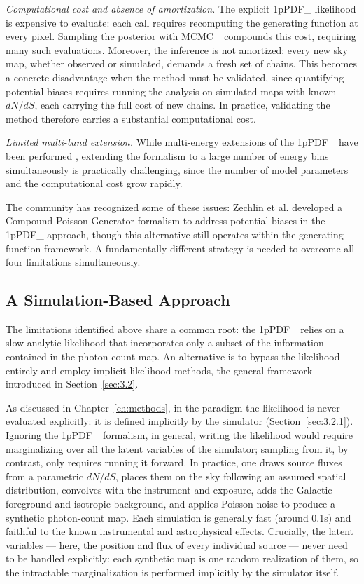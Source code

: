 \textit{Computational cost and absence of amortization.}
The explicit \gls{1pPDF_} likelihood is expensive to evaluate: each call requires recomputing the generating function at every pixel.
Sampling the posterior with \gls{MCMC_} compounds this cost, requiring many such evaluations.
Moreover, the inference is not amortized: every new sky map, whether observed or simulated, demands a fresh set of \MCMC chains.
This becomes a concrete disadvantage when the method must be validated, since quantifying potential biases requires running the analysis on simulated maps with known $dN/dS$, each carrying the full cost of new chains.
In practice, validating the method therefore carries a substantial computational cost.

\textit{Limited multi-band extension.} While multi-energy extensions of the \gls{1pPDF_} have been performed \cite{Zechlin:2016pme,Lisanti:2016jub}, extending the formalism to a large number of energy bins simultaneously is practically challenging, since the number of model parameters and the computational cost grow rapidly.

The community has recognized some of these issues: Zechlin et al. developed a Compound Poisson Generator formalism \cite{Cuoco-1pdf} to address potential biases in the \gls{1pPDF_} approach, though this alternative still operates within the generating-function framework.
A fundamentally different strategy is needed to overcome all four limitations simultaneously.

\subsection{A Simulation-Based Approach}
\label{sec:6.3.2}

The limitations identified above share a common root: the \gls{1pPDF_} relies on a slow analytic likelihood that incorporates only a subset of the information contained in the photon-count map.
An alternative is to bypass the likelihood entirely and employ implicit likelihood methods, the general framework introduced in Section~\ref{sec:3.2}.

As discussed in Chapter~\ref{ch:methods}, in the \SBI paradigm the likelihood is never evaluated explicitly: it is defined implicitly by the simulator (Section~\ref{sec:3.2.1}).
Ignoring the \gls{1pPDF_} formalism, in general, writing the likelihood would require marginalizing over all the latent variables of the simulator; sampling from it, by contrast, only requires running it forward.
In practice, one draws source fluxes from a parametric $dN/dS$, places them on the sky following an assumed spatial distribution, convolves with the instrument \PSF and exposure, adds the Galactic foreground and isotropic background, and applies Poisson noise to produce a synthetic photon-count map.
Each simulation is generally fast (around 0.1s) and faithful to the known instrumental and astrophysical effects.
Crucially, the latent variables --- here, the position and flux of every individual source --- never need to be handled explicitly: each synthetic map is one random realization of them, so the intractable marginalization is performed implicitly by the simulator itself.

